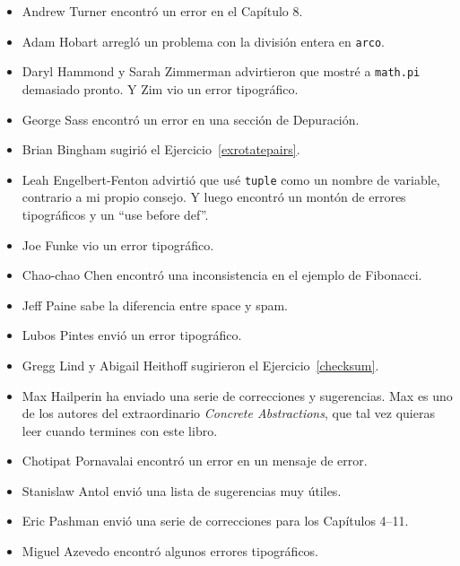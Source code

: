 \documentclass[10pt]{book}
\begin{document}
\begin{itemize}
\item Andrew Turner encontró un error en el Capítulo 8.

\item Adam Hobart arregló un problema con la división entera en {\tt arco}.

\item Daryl Hammond y Sarah Zimmerman advirtieron que mostré a
{\tt math.pi} demasiado pronto.  Y Zim vio un error tipográfico.

\item George Sass encontró un error en una sección de Depuración.

\item Brian Bingham sugirió el Ejercicio~\ref{exrotatepairs}.

\item Leah Engelbert-Fenton advirtió que usé {\tt tuple}
como un nombre de variable, contrario a mi propio consejo.  Y luego encontró
un montón de errores tipográficos y un ``use before def''.

\item Joe Funke vio un error tipográfico.

\item Chao-chao Chen encontró una inconsistencia en el ejemplo de Fibonacci.

\item Jeff Paine sabe la diferencia entre space y spam.

\item Lubos Pintes envió un error tipográfico.

\item Gregg Lind y Abigail Heithoff sugirieron el Ejercicio~\ref{checksum}.

\item Max Hailperin ha enviado una serie de correcciones y
  sugerencias.  Max es uno de los autores del extraordinario {\em
    Concrete Abstractions}, que tal vez quieras leer cuando termines
  con este libro.

\item Chotipat Pornavalai encontró un error en un mensaje de error.

\item Stanislaw Antol envió una lista de sugerencias muy útiles.

\item Eric Pashman envió una serie de correcciones para los Capítulos 4--11.

\item Miguel Azevedo encontró algunos errores tipográficos.


\end{itemize}
\end{document}
